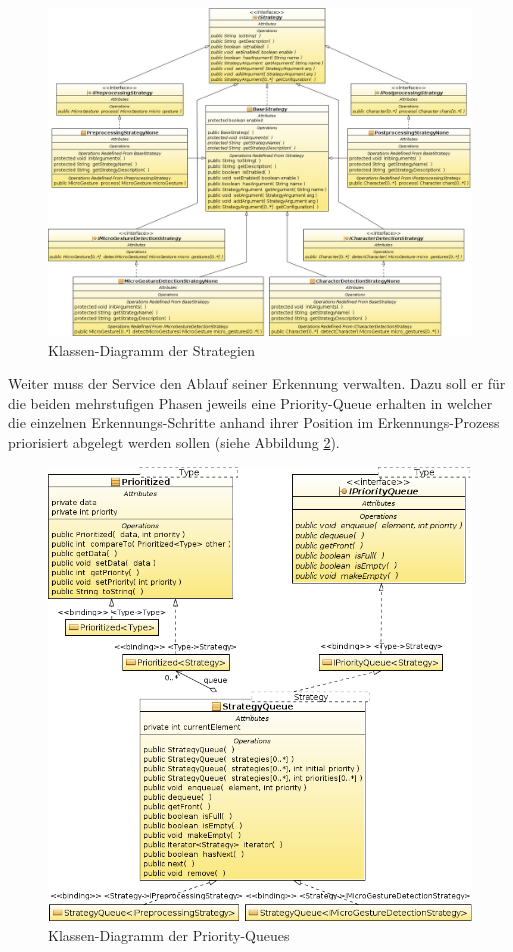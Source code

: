 \begin{figure}[bh!]
   \centering
   \includegraphics[width=\textwidth]{img/uml_cd_strategies} 
   \caption{Klassen-Diagramm der Strategien}
   \label{fig:cd_strategies}
\end{figure}

Weiter muss der Service den Ablauf seiner Erkennung verwalten. Dazu soll er für die beiden mehrstufigen Phasen jeweils eine Priority-Queue erhalten in welcher die einzelnen Erkennungs-Schritte anhand ihrer Position im Erkennungs-Prozess priorisiert abgelegt werden sollen (siehe Abbildung \ref{fig:cd_queues}).

\begin{figure}[bh!]
   \centering
   \includegraphics[width=\textwidth]{img/uml_cd_queue} 
   \caption{Klassen-Diagramm der Priority-Queues}
   \label{fig:cd_queues}
\end{figure}

